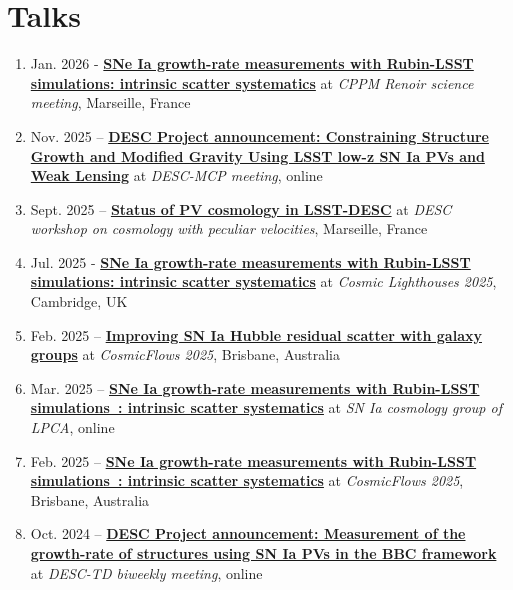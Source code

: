 \documentclass[11pt,a4paper,sans]{article}
\begin{document}
\section{Talks}
\begin{enumerate}
  \setlength\itemsep{1em}
   \item Jan. 2026 - \href{https://bastiencarreres.com/talks/CPPM-2026-12-01/index.html}{\textbf{SNe Ia growth-rate measurements with Rubin-LSST simulations: intrinsic scatter systematics}} at \textit{CPPM Renoir science meeting}, Marseille, France
  \item Nov. 2025 -- \href{https://bastiencarreres.com/talks/descmcp-2025-11-12/DESC_Project_Announcement_%20Constraining_Structure_Growth_and_Modified_Gravity_Using_LSST_lowz_SNe_Ia_PVs_and_Weak_Lensing.pdf}{\textbf{DESC Project announcement: Constraining Structure Growth and Modified Gravity Using LSST low-z SN Ia PVs and Weak Lensing}} at \textit{DESC-MCP meeting}, online
  \item Sept. 2025 -- \href{https://bastiencarreres.com/talks/desc-pv-workshop-2025-09-22/DESCPV-2025-09-22.pdf}{\textbf{Status of PV cosmology in LSST-DESC}} at \textit{DESC workshop on cosmology with peculiar velocities}, Marseille, France
   \item Jul. 2025 - \href{https://bastiencarreres.com/talks/cosmiclighthouse-2025-07-02/index.html}{\textbf{SNe Ia growth-rate measurements with Rubin-LSST simulations: intrinsic scatter systematics}} at \textit{Cosmic Lighthouses 2025}, Cambridge, UK
  \item Feb. 2025 -- \href{https://bastiencarreres.github.io/talks/cosmicflows-2025-02-03/CF2025_GalGrpSN_250203.pdf}{\textbf{Improving SN Ia Hubble residual scatter with galaxy groups}} at \textit{CosmicFlows 2025}, Brisbane, Australia
  \item Mar. 2025 -- \href{https://bastiencarreres.github.io/talks/clermontferrand-2025-03-19/index.html}{\textbf{SNe Ia growth-rate measurements with Rubin-LSST simulations~: intrinsic scatter systematics}} at \textit{SN Ia cosmology group of LPCA}, online
  \item Feb. 2025 -- \href{https://bastiencarreres.github.io/talks/cosmicflows-2025-02-06/index.html}{\textbf{SNe Ia growth-rate measurements with Rubin-LSST simulations~: intrinsic scatter systematics}} at \textit{CosmicFlows 2025}, Brisbane, Australia
  \item Oct. 2024 -- \href{https://bastiencarreres.github.io/talks/desctd-2024-10-15/DESC_PV_BBC_project.pdf}{\textbf{DESC Project announcement: Measurement of the growth-rate of structures using SN Ia PVs in the BBC framework}} at \textit{DESC-TD biweekly meeting}, online

\end{enumerate}
\end{document}
